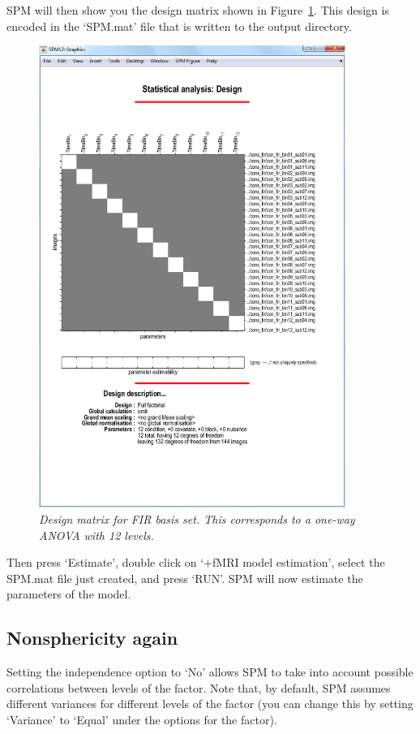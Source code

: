 \documentclass[a4paper,titlepage]{book}
\begin{document}
SPM will then show you the design matrix shown in Figure~\ref{fir_design}. This design is encoded in the `SPM.mat' file that is written to the output directory.
\begin{figure}
\begin{center}
\includegraphics[width=100mm]{faces_group/fir_design}
\caption{\em Design matrix for FIR basis set. This corresponds to a one-way ANOVA with 12 levels. \label{fir_design}}
\end{center}
\end{figure}
Then press `Estimate', double click on `+fMRI model   estimation', select the SPM.mat file just created, and press `RUN'.
SPM will now estimate the parameters of the model.

\subsection{Nonsphericity again}

Setting the independence option to `No' allows SPM to take into account possible correlations between levels of the factor. Note that, by default, SPM assumes different variances 
for different levels of the factor (you can change this by setting `Variance' to `Equal' under the options for the factor). 
\end{document}
